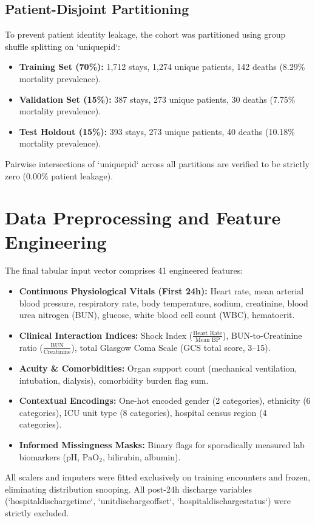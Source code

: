 \documentclass[conference]{IEEEtran}
\begin{document}
\subsection{Patient-Disjoint Partitioning}
To prevent patient identity leakage, the cohort was partitioned using group shuffle splitting on `uniquepid`:
\begin{itemize}
    \item \textbf{Training Set (70\%):} 1,712 stays, 1,274 unique patients, 142 deaths (8.29\% mortality prevalence).
    \item \textbf{Validation Set (15\%):} 387 stays, 273 unique patients, 30 deaths (7.75\% mortality prevalence).
    \item \textbf{Test Holdout (15\%):} 393 stays, 273 unique patients, 40 deaths (10.18\% mortality prevalence).
\end{itemize}
Pairwise intersections of `uniquepid` across all partitions are verified to be strictly zero ($0.00\%$ patient leakage).



\section{Data Preprocessing and Feature Engineering}
The final tabular input vector comprises 41 engineered features:
\begin{itemize}
    \item \textbf{Continuous Physiological Vitals (First 24h):} Heart rate, mean arterial blood pressure, respiratory rate, body temperature, sodium, creatinine, blood urea nitrogen (BUN), glucose, white blood cell count (WBC), hematocrit.
    \item \textbf{Clinical Interaction Indices:} Shock Index ($\frac{\text{Heart Rate}}{\text{Mean BP}}$), BUN-to-Creatinine ratio ($\frac{\text{BUN}}{\text{Creatinine}}$), total Glasgow Coma Scale (GCS total score, 3--15).
    \item \textbf{Acuity \& Comorbidities:} Organ support count (mechanical ventilation, intubation, dialysis), comorbidity burden flag sum.
    \item \textbf{Contextual Encodings:} One-hot encoded gender (2 categories), ethnicity (6 categories), ICU unit type (8 categories), hospital census region (4 categories).
    \item \textbf{Informed Missingness Masks:} Binary flags for sporadically measured lab biomarkers (pH, $\text{PaO}_2$, bilirubin, albumin).
\end{itemize}
All scalers and imputers were fitted exclusively on training encounters and frozen, eliminating distribution snooping. All post-24h discharge variables (`hospitaldischargetime`, `unitdischargeoffset`, `hospitaldischargestatus`) were strictly excluded.
\end{document}
